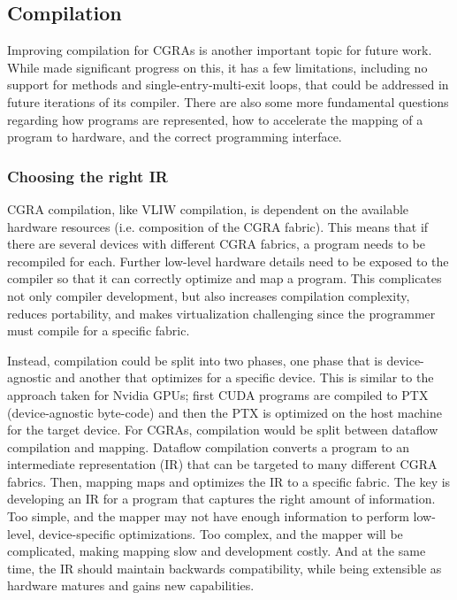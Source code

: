\subsection{Compilation}
Improving compilation for CGRAs is another important topic for future work.
% 
While \riptide made significant progress on this, it has a few limitations, including no support for methods and single-entry-multi-exit loops, that could be addressed in future iterations of its compiler.
% 
There are also some more fundamental questions regarding how programs are represented, how to accelerate the mapping of a program to hardware, and the correct programming interface.

\subsubsection{Choosing the right IR}
CGRA compilation, like VLIW compilation, is dependent on the available hardware resources (i.e. composition of the CGRA fabric).
% 
% 
This means that if there are several devices with different CGRA fabrics, a program needs to be recompiled for each.
% 
Further low-level hardware details need to be exposed to the compiler so that it can correctly optimize and map a program.
% 
This complicates not only compiler development, but also increases compilation complexity, reduces portability, and makes virtualization challenging since the programmer must compile for a specific fabric.

Instead, compilation could be split into two phases, one phase that is device-agnostic and another that optimizes for a specific device.
% 
This is similar to the approach taken for Nvidia GPUs; first CUDA programs are compiled to PTX~\cite{ptx} (device-agnostic byte-code) and then the PTX is optimized on the host machine for the target device.
% 
For CGRAs, compilation would be split between dataflow compilation and mapping.
% 
Dataflow compilation converts a program to an intermediate representation (IR) that can be targeted to many different CGRA fabrics.
% 
Then, mapping maps and optimizes the IR to a specific fabric.
% 
The key is developing an IR for a program that captures the right amount of information.
% 
Too simple, and the mapper may not have enough information to perform low-level, device-specific optimizations.
% 
Too complex, and the mapper will be complicated, making mapping slow and development costly.
%
And at the same time, the IR should maintain backwards compatibility, while being extensible as hardware matures and gains new capabilities.
% 


